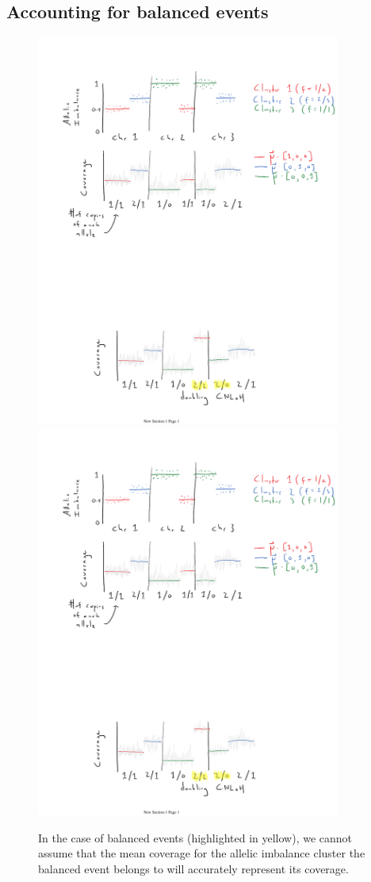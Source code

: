 \documentclass[10pt,letter]{article}
\numberwithin{equation}{section}
\begin{document}
\subsection{Accounting for balanced events}

\begin{figure}
\centering
\includegraphics[trim={1.5cm 20cm 6.5cm 3cm},clip,width=10cm]{Figs/fig2.pdf}
\includegraphics[trim={2.5cm 1cm 5cm 21cm},clip,width=10cm]{Figs/fig2.pdf}
\caption{In the case of balanced events (highlighted in yellow), we cannot assume that the mean coverage for the allelic imbalance cluster the balanced event belongs to will accurately represent its coverage.}
\label{BalancedNormFig}
\end{figure}
\end{document}

